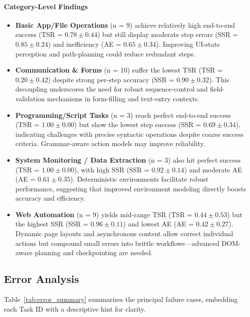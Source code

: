 \documentclass[runningheads]{llncs}
\begin{document}
\paragraph{Category-Level Findings}
\begin{itemize}[label=\textbullet,itemsep=1ex,parsep=0.5ex]
  \item \textbf{Basic App/File Operations} (n = 9) achieve relatively high end-to-end success (TSR = $0.78 \pm 0.44$) but still display moderate step errors (SSR = $0.85 \pm 0.24$) and inefficiency (AE = $0.65 \pm 0.34$). Improving UI-state perception and path-planning could reduce redundant steps.
  \item \textbf{Communication \& Forms} (n = 10) suffer the lowest TSR (TSR = $0.20 \pm 0.42$) despite strong per-step accuracy (SSR = $0.90 \pm 0.32$). This decoupling underscores the need for robust sequence-control and field-validation mechanisms in form-filling and text-entry contexts.
  \item \textbf{Programming/Script Tasks} (n = 3) reach perfect end-to-end success (TSR = $1.00 \pm 0.00$) but show the lowest step success (SSR = $0.69 \pm 0.34$), indicating challenges with precise syntactic operations despite coarse success criteria. Grammar-aware action models may improve reliability.
  \item \textbf{System Monitoring / Data Extraction} (n = 3) also hit perfect success (TSR = $1.00 \pm 0.00$), with high SSR (SSR = $0.92 \pm 0.14$) and moderate AE (AE = $0.61 \pm 0.35$). Deterministic environments facilitate robust performance, suggesting that improved environment modeling directly boosts accuracy and efficiency.
  \item \textbf{Web Automation} (n = 9) yields mid-range TSR (TSR = $0.44 \pm 0.53$) but the highest SSR (SSR = $0.96 \pm 0.11$) and lowest AE (AE = $0.42 \pm 0.27$). Dynamic page layouts and asynchronous content allow correct individual actions but compound small errors into brittle workflows—advanced DOM-aware planning and checkpointing are needed.
\end{itemize}

\subsection{Error Analysis}

Table~\ref{tab:error_summary} summarizes the principal failure cases, embedding each Task ID with a descriptive hint for clarity.
\end{document}
